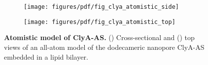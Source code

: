 \begin{figure}[htbp]
\centering
\begin{subfigure}[t]{6cm}
	\centering
	\caption{}\label{fig:clya_atomistic_side}
	\texttt{[image: figures/pdf/fig\_clya\_atomistic\_side]}

	
\end{subfigure}
\begin{subfigure}[t]{6cm}
	\centering
	\caption{}\label{fig:clya_atomistic_top}
	\texttt{[image: figures/pdf/fig\_clya\_atomistic\_top]}
\end{subfigure}


\caption[\textbf{Atomistic model of ClyA-AS.}]
{
\textbf{Atomistic model of ClyA-AS.}
() Cross-sectional and () top views of an all-atom model of the dodecameric nanopore ClyA-AS embedded in a lipid bilayer.
}
\label{fig:clya_atomistic}
\end{figure}

